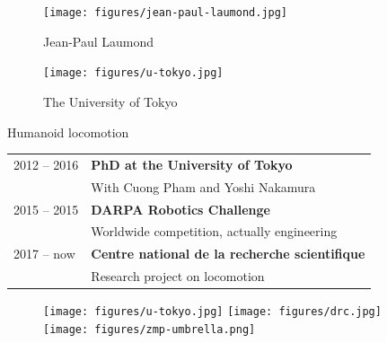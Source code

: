 \documentclass[9pt, aspectratio=43]{beamer}
\newcommand{\highlight}[1]{{\color{hlcolor} \textbf{#1}}}
\begin{document}
\begin{frame}
    \begin{figure}
        \centering
        \texttt{[image: figures/jean-paul-laumond.jpg]}

        {Jean-Paul Laumond}
    \end{figure}
\end{frame}

\begin{frame}
    \begin{figure}
        \centering
        \texttt{[image: figures/u-tokyo.jpg]}

        {The University of Tokyo}
    \end{figure}
\end{frame}

\begin{frame}{Humanoid locomotion}
    \begin{tabular}{ll}
        2012 – 2016 & \highlight{PhD at the University of Tokyo}
        \vspace{.1em} \\ & With Cuong {Pham} and Yoshi {Nakamura}
        \vspace{0.7em}
        \\
        2015 – 2015 & \highlight{DARPA Robotics Challenge}
        \vspace{.1em} \\ & Worldwide competition, actually engineering
        \vspace{0.7em}
        \\
        2017 – now & \highlight{Centre national de la recherche scientifique}
        \vspace{.1em} \\ & Research project on locomotion
        \newline
    \end{tabular}
    \begin{figure}
        \vspace{0.5em}
        \texttt{[image: figures/u-tokyo.jpg]} \hspace{0.1em}
        \texttt{[image: figures/drc.jpg]} \hspace{0.1em}
        \texttt{[image: figures/zmp-umbrella.png]}
        \vspace{-3em}
    \end{figure}
\end{frame}
\end{document}
